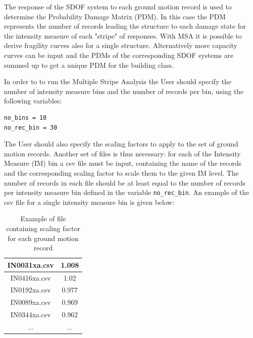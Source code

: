 The response of the SDOF system to each ground motion record is used to determine the Probability Damage Matrix (PDM). In this case the PDM represents the number of records leading the structure to each damage state for the intensity measure of each "stripe" of responses. With MSA it is possible to derive fragility curves also for a single structure. Alternatively more capacity curves can be input and the PDMs of the corresponding SDOF systems are summed up to get a unique PDM for the building class.

In order to to run the Multiple Stripe Analysis the User should specify the number of intensity measure bins and the number of records per bin, using the following variables:

\begin{Verbatim}[frame=single, commandchars=\\\{\}, samepage=true]
no_bins = 10
no_rec_bin = 30
\end{Verbatim}

The User should also specify the scaling factors to apply to the set of ground motion records. Another set of files is thus necessary: for each of the Intensity Measure (IM) bin a csv file must be input, containing the name of the records and the corresponding scaling factor to scale them to the given IM level. The number of records in each file should be at least equal to the number of records per intensity measure bin defined in the variable \verb=no_rec_bin=. An example of the csv file for a single intensity measure bin is given below:

\begin {table}[htb]
\caption{Example of file containing scaling factor for each ground motion record}
\label{table:pinching4}
\begin{center}
  \begin{tabular}{ | c | c |}
  \hline
	IN0031xa.csv & 1.008\\ \hline
	IN0416xa.csv & 1.02\\ \hline
	IN0192xa.csv & 0.977\\ \hline
	IN0089xa.csv & 0.969\\ \hline
	IN0344xa.csv & 0.962\\ \hline
	... & ... \\ \hline
	\end{tabular}
\end{center}
\end{table}

